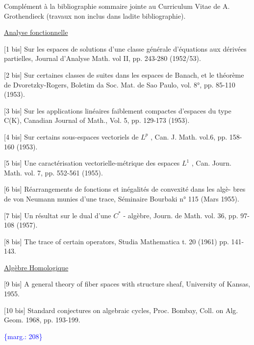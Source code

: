 \documentclass[11pt]{article}
\newcommand{\scanpage}[1]{\par\bigskip\noindent{\small\sffamily[scan #1]}\par}
\newcommand{\mspage}[1]{{\small\sffamily[p.\,#1]}}
\newcommand{\hand}[1]{\textcolor{blue}{#1}}
\newcommand{\margin}[1]{\textcolor{blue}{\{\textsf{marg.:} #1\}}}
\newcommand{\uline}[1]{\underline{#1}}
\begin{document}
\mspage{\hand{207}}

\clearpage
\scanpage{119/208}
\mspage{- 13 -}

Complément à la bibliographie sommaire jointe au Curriculum Vitae de
A. Grothendieck (travaux non inclus dans ladite bibliographie).

\uline{Analyse fonctionnelle}

[1 bis] Sur les espaces de solutions d'une classe générale d'équations aux
dérivées partielles, Journal d'Analyse Math. vol II, pp. 243-280
(1952/53).

[2 bis] Sur certaines classes de suites dans les espaces de Banach, et le
théorème de Dvoretzky-Rogers, Boletim da Soc. Mat. de Sao Paulo, vol.
8°, pp. 85-110 (1953).

[3 bis] Sur les applications linéaires faiblement compactes d'espaces du type
C(K), Canadian Journal of Math., Vol. 5, pp. 129-173 (1953).

[4 bis] Sur certains sous-espaces vectoriels de $L^p$ , Can. J. Math. vol.6,
pp. 158-160 (1953).

[5 bis] Une caractérisation vectorielle-métrique des espaces $L^1$ , Can. Journ.
Math. vol. 7, pp. 552-561 (1955).

[6 bis] Réarrangements de fonctions et inégalités de convexité dans les algè-%
bres de von Neumann munies d'une trace, Séminaire Bourbaki n° 115
(Mars 1955).

[7 bis] Un résultat sur le dual d'une $C^*$ - algèbre, Journ. de Math. vol. 36,
pp. 97-108 (1957).

[8 bis] The trace of certain operators, Studia Mathematica t. 20 (1961)
pp. 141-143.

\uline{Algèbre Homologique}

[9 bis] A general theory of fiber spaces with structure sheaf, University of
Kansas, 1955.

[10 bis] Standard conjectures on algebraic cycles, Proc. Bombay, Coll. on Alg.
Geom. 1968, pp. 193-199.

\margin{208}

\clearpage
\scanpage{119/209}
\mspage{- 14 -}
\end{document}

